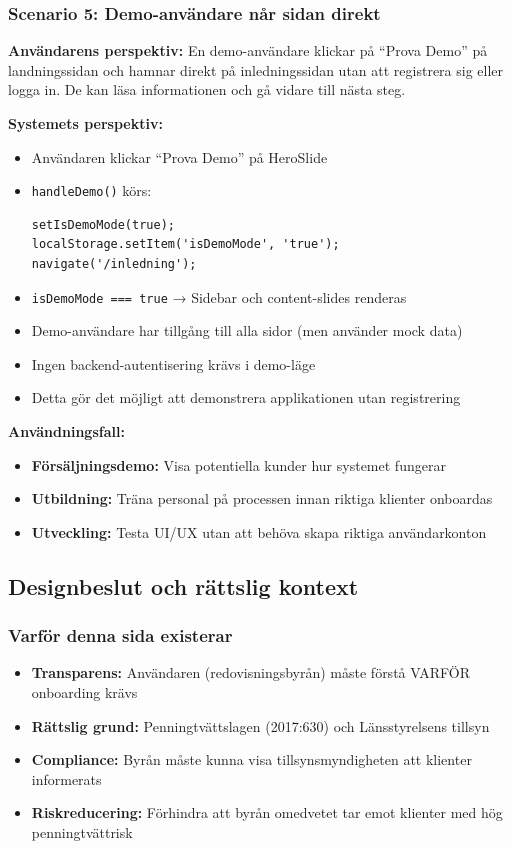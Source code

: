 \documentclass[12pt,a4paper]{article}
\begin{document}
\subsubsection{Scenario 5: Demo-användare når sidan direkt}

\textbf{Användarens perspektiv:}
En demo-användare klickar på ``Prova Demo'' på landningssidan och hamnar direkt på inledningssidan utan att registrera sig eller logga in. De kan läsa informationen och gå vidare till nästa steg.

\textbf{Systemets perspektiv:}
\begin{itemize}[noitemsep]
  \item Användaren klickar ``Prova Demo'' på HeroSlide
  \item \texttt{handleDemo()} körs:
  \begin{verbatim}
setIsDemoMode(true);
localStorage.setItem('isDemoMode', 'true');
navigate('/inledning');
  \end{verbatim}
  \item \texttt{isDemoMode === true} → Sidebar och content-slides renderas
  \item Demo-användare har tillgång till alla sidor (men använder mock data)
  \item Ingen backend-autentisering krävs i demo-läge
  \item Detta gör det möjligt att demonstrera applikationen utan registrering
\end{itemize}

\textbf{Användningsfall:}
\begin{itemize}[noitemsep]
  \item \textbf{Försäljningsdemo:} Visa potentiella kunder hur systemet fungerar
  \item \textbf{Utbildning:} Träna personal på processen innan riktiga klienter onboardas
  \item \textbf{Utveckling:} Testa UI/UX utan att behöva skapa riktiga användarkonton
\end{itemize}

\subsection{Designbeslut och rättslig kontext}

\subsubsection{Varför denna sida existerar}
\begin{itemize}[noitemsep]
  \item \textbf{Transparens:} Användaren (redovisningsbyrån) måste förstå VARFÖR onboarding krävs
  \item \textbf{Rättslig grund:} Penningtvättslagen (2017:630) och Länsstyrelsens tillsyn
  \item \textbf{Compliance:} Byrån måste kunna visa tillsynsmyndigheten att klienter informerats
  \item \textbf{Riskreducering:} Förhindra att byrån omedvetet tar emot klienter med hög penningtvättrisk
\end{itemize}
\end{document}

